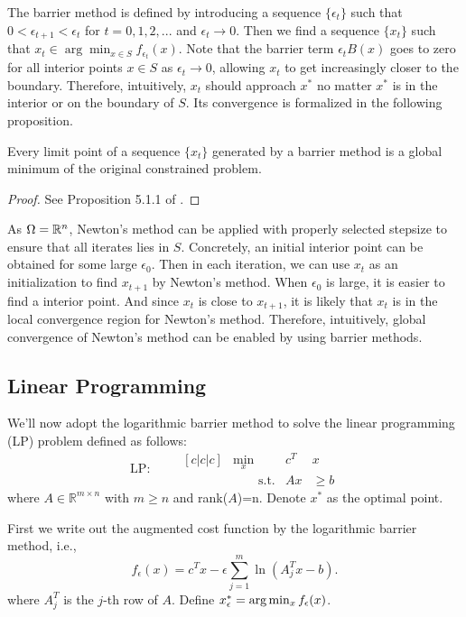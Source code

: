 \begin{definition}
The barrier method is defined by introducing a sequence $\{\epsilon_t\}$ such that $0<\epsilon_{t+1}<\epsilon_t$ for $t=0,1,2,...$ and $\epsilon_t\rightarrow{0}$. Then we find a sequence $\{x_t\}$ such that $x_t\in{\arg \min_{x\in{S}}}f_{\epsilon_t}(x)$. Note that the barrier term $\epsilon_t{B(x)}$ goes to zero for all interior points $x\in{S}$ as $\epsilon_t\rightarrow{0}$, allowing $x_t$ to get increasingly closer to the boundary. Therefore, intuitively, $x_t$ should approach $x^*$ no matter $x^*$ is in the interior or on the boundary of $S$. Its convergence is formalized in the following proposition. 

\begin{proposition}
Every limit point of a sequence $\{x_t\}$ generated by a barrier method is a global minimum of the original constrained problem. 
\end{proposition}
\begin{proof}
See Proposition 5.1.1 of \cite{bertsekas2016nonlinear}.
\end{proof}

As $\Omega=\mathbb{R}^n$, Newton's method can be applied with properly selected stepsize to ensure that all iterates lies in $S$. Concretely, an initial interior point can be obtained for some large $\epsilon_0$. Then in each iteration, we can use $x_t$ as an initialization to find $x_{t+1}$ by Newton's method. When $\epsilon_0$ is large, it is easier to find a interior point. And since $x_t$ is close to $x_{t+1}$, it is likely that $x_t$ is in the local convergence region for Newton's method. Therefore, intuitively, global convergence of Newton's method can be enabled by using barrier methods.


\end{definition}
\subsection{Linear Programming}
We'll now adopt the logarithmic barrier method to solve the linear programming (LP) problem defined as follows:
\begin{equation}
\label{eq:LP_def}
\text{LP}:\qquad
\begin{aligned}[c|c|c]
&\min_x &c^T&x\\
&\qquad\text{s.t.} &Ax&\ge b
\end{aligned}
\end{equation}
where $A\in\mathbb{R}^{m\times n}$ with $m\ge n$ and rank($A$)=n. Denote $x^*$ as the optimal point. 

First we write out the augmented cost function by the logarithmic barrier method, i.e.,
\begin{equation}
\label{eq:LP_aug_cost}
f_\epsilon(x) = c^T x-\epsilon \sum_{j=1}^m\ln\left(A^T_j x-b\right).
\end{equation}
where $A^T_j$ is the $j$-th row of $A$. Define $x^*_\epsilon=\arg\min_x f_\epsilon(x)$. 

